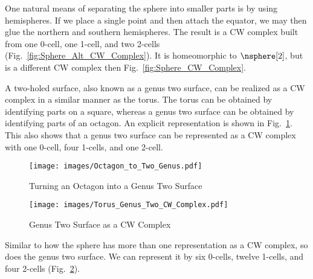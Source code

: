 \documentclass{book}                                                           %
\begin{document}
            \hfill
            \begin{minipage}[t]{0.54\textwidth}
                \begin{example}
                    One natural means of separating the sphere into smaller
                    parts is by using hemispheres. If we place a single point
                    and then attach the equator, we may then glue the northern
                    and southern hemispheres. The result is a CW complex built
                    from one 0-cell, one 1-cell, and two 2-cells
                    (Fig.~\ref{fig:Sphere_Alt_CW_Complex}). It is homeomorphic
                    to $\nsphere[2]$, but is a different CW complex then
                    Fig.~\ref{fig:Sphere_CW_Complex}.
                \end{example}
            \end{minipage}
            \par\vspace{2.5ex}
            \begin{example}
                A two-holed surface, also known as a genus two surface, can be
                realized as a CW complex in a similar manner as the torus. The
                torus can be obtained by identifying parts on a square, whereas
                a genus two surface can be obtained by identifying parts of an
                octagon. An explicit representation is shown in
                Fig.~\ref{fig:Octagon_to_Genus_Two}. This also shows that a
                genus two surface can be represented as a CW complex with one
                0-cell, four 1-cells, and one 2-cell.
            \end{example}
            \begin{figure}[H]
                \centering
                \captionsetup{type=figure}
                \texttt{[image: images/Octagon\_to\_Two\_Genus.pdf]}
                \caption{Turning an Octagon into a Genus Two Surface}
                \label{fig:Octagon_to_Genus_Two}
            \end{figure}
            \begin{figure}[H]
                \centering
                \captionsetup{type=figure}
                \texttt{[image: images/Torus\_Genus\_Two\_CW\_Complex.pdf]}
                \caption{Genus Two Surface as a CW Complex}
                \label{fig:Genus_Two_CW_Complex}
            \end{figure}
            \begin{example}
                Similar to how the sphere has more than one representation as a
                CW complex, so does the genus two surface. We can represent it
                by six 0-cells, twelve 1-cells, and four 2-cells
                (Fig.~\ref{fig:Genus_Two_CW_Complex}).
            \end{example}
\end{document}
